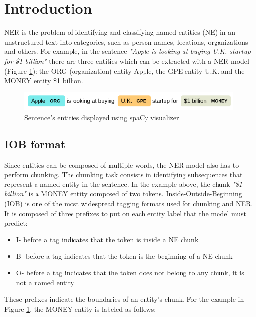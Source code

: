 \documentclass[journal]{IEEEtran}
\begin{document}
\section{Introduction}
NER is the problem of identifying and classifying named entities (NE) in an unstructured text into categories, such as person names, locations, organizations and others. 
For example, in the sentence \textit{"Apple is looking at buying U.K. startup for \$1 billion"} there are three entities which can be extracted with a NER model (Figure \ref{fig:ner-sent}): the ORG (organization) entity Apple, the GPE entity U.K. and the MONEY entity \$1 billion.


\begin{figure}[h]
    \centering
    \includegraphics[scale=0.4]{Figures/ner-sent.png}
    \caption{Sentence's entities displayed using spaCy visualizer}
    \label{fig:ner-sent}
\end{figure}


\subsection{IOB format}
Since entities can be composed of multiple words, the NER model also has to perform chunking. The chunking task consists in identifying subsequences that represent a named entity in the sentence. In the example above, the chunk \textit{"\$1 billion"} is a MONEY entity composed of two tokens.
Inside-Outside-Beginning (IOB) \cite{ramshaw-marcus-1995-text} is one of the most widespread tagging formats used for chunking and NER. It is composed of three prefixes to put on each entity label that the model must predict:

\begin{itemize}
    \item I- before a tag indicates that the token is inside a NE chunk
    \item B- before a tag indicates that the token is the beginning of a NE chunk
    \item O- before a tag indicates that the token does not belong to any chunk, it is not a named entity
\end{itemize}

These prefixes indicate the boundaries of an entity's chunk.
For the example in Figure \ref{fig:ner-sent}, the MONEY entity is labeled as follows:
\end{document}
